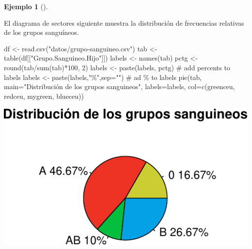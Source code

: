 \documentclass[
  a4paper,
]{scrreport}
\newenvironment{Shaded}{\begin{snugshade}}{\end{snugshade}}
\newcommand{\AttributeTok}[1]{\textcolor[rgb]{0.40,0.45,0.13}{#1}}
\newcommand{\CommentTok}[1]{\textcolor[rgb]{0.37,0.37,0.37}{#1}}
\newcommand{\DecValTok}[1]{\textcolor[rgb]{0.68,0.00,0.00}{#1}}
\newcommand{\FunctionTok}[1]{\textcolor[rgb]{0.28,0.35,0.67}{#1}}
\newcommand{\NormalTok}[1]{\textcolor[rgb]{0.00,0.23,0.31}{#1}}
\newcommand{\OtherTok}[1]{\textcolor[rgb]{0.00,0.23,0.31}{#1}}
\newcommand{\SpecialCharTok}[1]{\textcolor[rgb]{0.37,0.37,0.37}{#1}}
\newcommand{\StringTok}[1]{\textcolor[rgb]{0.13,0.47,0.30}{#1}}
\theoremstyle{plain}
\theoremstyle{definition}
\theoremstyle{definition}
\newtheorem{example}{Ejemplo}[chapter]
\theoremstyle{remark}
\begin{document}
\begin{example}[]\protect\hypertarget{exm-diagrama-sectores}{}\label{exm-diagrama-sectores}

El diagrama de sectores siguiente muestra la distribución de frecuencias
relativas de los grupos sanguíneos.

\begin{Shaded}
\begin{Highlighting}[]
\NormalTok{df }\OtherTok{\textless{}{-}} \FunctionTok{read.csv}\NormalTok{(}\StringTok{"datos/grupo{-}sanguineo.csv"}\NormalTok{)}
\NormalTok{tab }\OtherTok{\textless{}{-}} \FunctionTok{table}\NormalTok{(df[[}\StringTok{"Grupo.Sanguineo.Hijo"}\NormalTok{]])}
\NormalTok{labels }\OtherTok{\textless{}{-}} \FunctionTok{names}\NormalTok{(tab)}
\NormalTok{pctg }\OtherTok{\textless{}{-}} \FunctionTok{round}\NormalTok{(tab}\SpecialCharTok{/}\FunctionTok{sum}\NormalTok{(tab)}\SpecialCharTok{*}\DecValTok{100}\NormalTok{, }\DecValTok{2}\NormalTok{)}
\NormalTok{labels }\OtherTok{\textless{}{-}} \FunctionTok{paste}\NormalTok{(labels, pctg) }\CommentTok{\# add percents to labels }
\NormalTok{labels }\OtherTok{\textless{}{-}} \FunctionTok{paste}\NormalTok{(labels,}\StringTok{"\%"}\NormalTok{,}\AttributeTok{sep=}\StringTok{""}\NormalTok{) }\CommentTok{\# ad \% to labels }
\FunctionTok{pie}\NormalTok{(tab, }\AttributeTok{main=}\StringTok{"Distribución de los grupos sanguineos"}\NormalTok{, }\AttributeTok{labels=}\NormalTok{labels, }\AttributeTok{col=}\FunctionTok{c}\NormalTok{(greenceu, redceu, mygreen, blueceu))}
\end{Highlighting}
\end{Shaded}

\includegraphics{02-estadistica-descriptiva_files/figure-pdf/diagrama-sectores-1.pdf}

\end{example}
\end{document}
